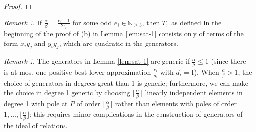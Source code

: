 \documentclass{amsart}
\theoremstyle{plain}
\theoremstyle{definition}
\theoremstyle{remark}
\newtheorem{rem}[thm]{Remark}
\numberwithin{equation}{section}
\newcommand\BN{{\mathbb N}}
\begin{document}
\begin{proof}



\end{proof}

\begin{rem}\label{rem:quad-gen}
If $\frac{\alpha}{\beta}=\frac{e_i-1}{2 e_i}$ for some odd $e_i \in \BN_{\geq 3}$, then $T,$ as defined in the beginning of the proof of (b) in Lemma \ref{lem:sat-1} consists only of terms of the form $x_i y_j$ and $y_i y_j$, which are quadratic in the generators.
\end{rem}


\begin{rem}\label{rem:sat-1-gen-lem-generic}
The generators in Lemma \ref{lem:sat-1} are generic if $\frac{\alpha}{\beta}\le 1$ (since there is at most one positive best lower approximation $\frac{c_i}{d_i}$ with $d_i=1$).  When $\frac{\alpha}{\beta}>1$, the choice of generators in degrees great than 1 is generic; furthermore, we can make the choice in degree 1 generic by choosing $\lfloor \frac{\alpha}{\beta}\rfloor$ linearly independent elements in degree 1 with pole at $P$ of order $\lfloor \frac{\alpha}{\beta}\rfloor$ rather than elements with poles of order $1, \ldots, \lfloor \frac{\alpha}{\beta}\rfloor$; this requires minor complications in the construction of generators of the ideal of relations.
\end{rem}
\end{document}
